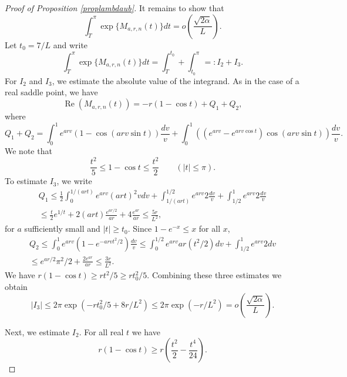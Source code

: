 \documentclass[10pt,a4paper]{amsart}
\DeclareMathOperator{\re}{Re}
\begin{document}
\begin{proof}[Proof of Proposition \ref{proplambdaub}]
It remains to show that 
$$
 \int_{T}^{\pi} \exp\{ M_{a,r,n}(t) \} dt = o\left(\frac{\sqrt{2\alpha}}{L} \right).
$$
Let $t_0 = 7/L$ and write
$$
 \int_{T}^{\pi} \exp\{ M_{a,r,n}(t) \} dt = \int_{T}^{t_0} + \int_{t_0}^{\pi} =: I_2 +I_3.
$$
For $I_2$ and $I_3$, we estimate the absolute value of the integrand. As in the case of a real saddle point,  we have
$$
\re(M_{a,r,n}(t)) = -r(1-\cos t ) + Q_1+Q_2,
$$
where
\begin{equation*}
Q_1+Q_2 =  \int_0^1 e^{arv}(1-\cos(arv \sin t) ) \frac{dv}{v} +  \int_0^1 ((e^{arv}-e^{arv \cos t })\cos(arv \sin t) ) \frac{dv}{v}.
\end{equation*}
We note that 
$$\frac{t^2}{5} \le 1-\cos t \le  \frac{t^2}{2}\qquad (|t| \le \pi).
$$ 
To estimate $I_3$, we write
\begin{multline*}
Q_1 \le \frac{1}{2}\int_0^{1/(ar t)} e^{arv}( a r  t)^2 v dv +  \int_{1/(ar t)}^{1/2} e^{arv} 2 \frac{dv}{v} + \int_{1/2}^1 e^{arv} 2 \frac{dv}{v}\\
\le \frac{t}{2}e^{1/t} + 2 (ar t) \frac{e^{ar/2}}{ar} + 4 \frac{e^{ar}}{ar}  \le  \frac{5r}{L^2},
\end{multline*}
for $a$ sufficiently small and $|t|\ge t_0$.
Since $1-e^{-x} \le x$ for all $x$, 
\begin{multline*}
Q_2 \le \int_0^{1} e^{arv}( 1-e^{-arv t^2/2}) \frac{dv}{v}\le \int_0^{1/2} e^{arv} ar (t^2/2) dv +  \int_{1/2}^1  e^{arv} 2 dv \\
\le e^{ar/2}\pi^2/2 + \frac{2 e^{ar}}{ar} \le \frac{3r}{L^2}.
\end{multline*}
We have $r(1-\cos t) \ge r t^2/5 \ge r t_0^2/5$. Combining these three estimates we obtain
$$
|I_3| \le 2\pi \exp( - rt_0^2/5 +8r/L^2) \le 2\pi \exp(-r/L^2)= o\left(\frac{\sqrt{2\alpha}}{L} \right).
$$

Next, we estimate $I_2$. For all real $t$ we have
$$
 r(1-\cos t) \ge r \left(\frac{ t^2}{2}-\frac{t^4}{24}\right).
$$


\end{proof}
\end{document}
